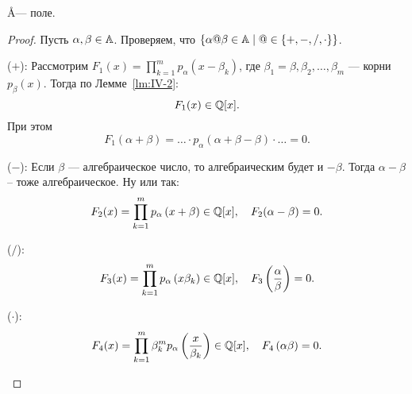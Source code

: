 \begin{ntheorem}
\label{thm:IV-2}
    \AA --- поле.
\end{ntheorem}
\begin{proof}
    Пусть $\alpha, \beta \in \AA$. Проверяем, что $\left\{ \alpha @ \beta \in \AA \mid @ \in \{+, -, /, \cdot \} \right\}$.
    \begin{statesp}
        \item[($+$):]
            Рассмотрим $F_1(x) = \prod_{k=1}^m p_\alpha\left( x-\beta_k \right)$, где $\beta_1 = \beta, \beta_2, \dots, \beta_m$ --- корни $p_\beta(x)$. Тогда по Лемме~\ref{lm:IV-2}:
            \[
                F_1(x) \in \QQ[x].
            \]
            При этом 
            \[
                F_1(\alpha + \beta) = \ldots \cdot p_\alpha(\alpha + \beta - \beta) \cdot \ldots = 0.
            \]
        \item[($-$):]
            Если $\beta$ --- алгебраическое число, то алгебраическим будет и $-\beta$. Тогда $\alpha - \beta$ -- тоже алгебраическое. Ну или так:
            \[
                F_2(x) = \prod_{k=1}^m p_\alpha \left( x + \beta \right) \in \QQ[x], \quad F_2(\alpha - \beta) = 0.
            \]
        \item[($/$):]
            \[
                F_3(x) = \prod_{k=1}^m p_\alpha\left( x\beta_k \right) \in \QQ[x], \quad F_3\left( \frac{\alpha}{\beta} \right) = 0.
            \]
        \item[($\cdot$):]
            \[
                F_4(x) = \prod_{k=1}^m \beta_k^m p_\alpha\left( \frac{x}{\beta_k} \right) \in \QQ[x], \quad F_4\left( \alpha\beta \right) = 0.
            \]
    \end{statesp}
\end{proof}
